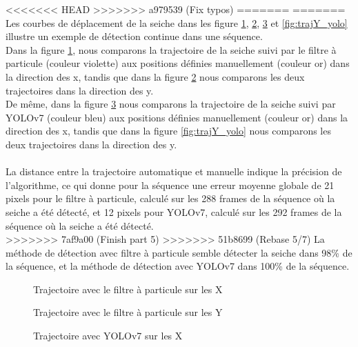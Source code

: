 <<<<<<< HEAD
>>>>>>> a979539 (Fix typos)
=======
=======
Les courbes de déplacement de la seiche dans les figure \ref{fig:trajX_pf}, \ref{fig:trajY_pf}, \ref{fig:trajX_yolo} et \ref{fig:trajY_yolo} illustre un exemple de détection continue dans une séquence.\\
Dans la figure \ref{fig:trajX_pf}, nous comparons la trajectoire de la seiche suivi par le filtre à particule (couleur violette) aux positions définies manuellement (couleur or) dans la direction des x, tandis que dans la figure \ref{fig:trajY_pf} nous comparons les deux trajectoires dans la direction des y.\\
De même, dans la figure \ref{fig:trajX_yolo} nous comparons la trajectoire de la seiche suivi par YOLOv7 (couleur bleu) aux positions définies manuellement (couleur or) dans la direction des x, tandis que dans la figure \ref{fig:trajY_yolo} nous comparons les deux trajectoires dans la direction des y.\\
\\
La distance entre la trajectoire automatique et manuelle indique la précision de l'algorithme, ce qui donne pour la séquence une erreur moyenne globale de 21 pixels pour le filtre à particule, calculé sur les 288 frames de la séquence où la seiche a été détecté, et 12 pixels pour YOLOv7, calculé sur les 292 frames de la séquence où la seiche a été détecté.\\
>>>>>>> 7af9a00 (Finish part 5)
>>>>>>> 51b8699 (Rebase 5/7)
La méthode de détection avec filtre à particule semble détecter la seiche dans 98\% de la séquence, et la méthode de détection avec YOLOv7 dans 100\% de la séquence.

\begin{figure}[!htbp]
\center
\caption{Trajectoire avec le filtre à particule sur les X}
\label{fig:trajX_pf}
\end{figure}
\FloatBarrier

\begin{figure}[!htbp]
\center
\caption{Trajectoire avec le filtre à particule sur les Y}
\label{fig:trajY_pf}
\end{figure}
\FloatBarrier

\begin{figure}[!htbp]
\center
\caption{Trajectoire avec YOLOv7 sur les X}
\label{fig:trajX_yolo}
\end{figure}
\FloatBarrier

